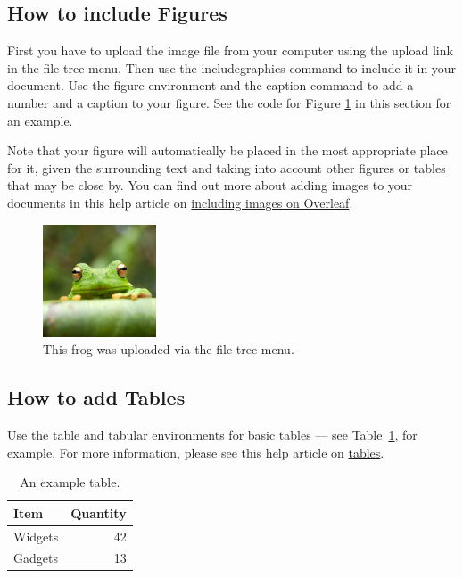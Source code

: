 \documentclass{article}
\begin{document}
\subsection{How to include Figures}

First you have to upload the image file from your computer using the upload link in the file-tree menu. Then use the includegraphics command to include it in your document. Use the figure environment and the caption command to add a number and a caption to your figure. See the code for Figure \ref{fig:frog} in this section for an example.

Note that your figure will automatically be placed in the most appropriate place for it, given the surrounding text and taking into account other figures or tables that may be close by. You can find out more about adding images to your documents in this help article on \href{https://www.overleaf.com/learn/how-to/Including_images_on_Overleaf}{including images on Overleaf}.

\begin{figure}[H]
\centering
\includegraphics[width=0.3\textwidth]{images/frog.jpg}
\caption{\label{fig:frog}This frog was uploaded via the file-tree menu.}
\end{figure}

\subsection{How to add Tables}

Use the table and tabular environments for basic tables --- see Table~\ref{tab:widgets}, for example. For more information, please see this help article on \href{https://www.overleaf.com/learn/latex/tables}{tables}.

\begin{table}[H]
\centering
\begin{tabular}{l|r}
Item & Quantity \\\hline
Widgets & 42 \\
Gadgets & 13
\end{tabular}
\caption{\label{tab:widgets}An example table.}
\end{table}
\end{document}
